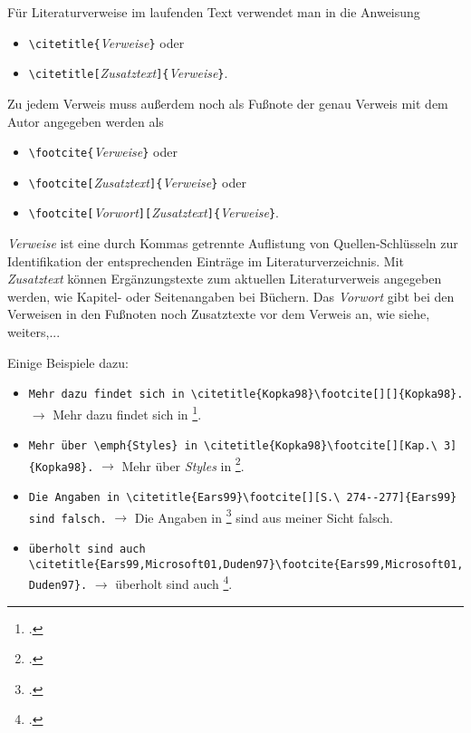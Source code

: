 Für Literaturverweise im laufenden Text verwendet man in \latex die Anweisung
\begin{itemize}
\item[] \verb!\citetitle{!\textit{Verweise}\verb!}! oder
\item[] \verb!\citetitle[!\textit{Zusatztext}\verb!]{!\textit{Verweise}\verb!}!.
\end{itemize}

\noindent%
Zu jedem Verweis muss außerdem noch als Fußnote der genau Verweis mit dem Autor angegeben werden als

\begin{itemize}
\item[] \verb!\footcite{!\textit{Verweise}\verb!}! oder
\item[] \verb!\footcite[!\textit{Zusatztext}\verb!]{!\textit{Verweise}\verb!}! oder
\item[] \verb!\footcite[!\textit{Vorwort}\verb!][!\textit{Zusatztext}\verb!]{!\textit{Verweise}\verb!}!.
\end{itemize}

\noindent%
\textit{Verweise} ist eine durch Kommas getrennte Auflistung von Quellen-Schlüsseln
zur Identifikation der entsprechenden Einträge im Literaturverzeichnis.
Mit \textit{Zusatztext} können Ergänzungstexte zum aktuellen Literaturverweis angegeben
werden, wie \zB Kapitel- oder Seitenangaben bei Büchern. Das \textit{Vorwort} gibt bei den Verweisen in den Fußnoten noch Zusatztexte vor dem Verweis an, wie \zB siehe, weiters,...

Einige Beispiele dazu:
\begin{itemize}
\item[] \verb!Mehr dazu findet sich in \citetitle{Kopka98}\footcite[][]{Kopka98}.! \newline
      $\rightarrow$ Mehr dazu findet sich in \footcite[][]{Kopka98}.
\item[] \verb!Mehr über \emph{Styles} in \citetitle{Kopka98}\footcite[][Kap.\ 3]{Kopka98}.! \newline
      $\rightarrow$ Mehr über \emph{Styles} in \footcite[][Kap.\ 3]{Kopka98}.
\item[] \verb!Die Angaben in \citetitle{Ears99}\footcite[][S.\ 274--277]{Ears99} sind falsch.! \newline
      $\rightarrow$ Die Angaben in \footcite[][S.\ 274--277]{Ears99} sind aus meiner Sicht falsch.
\item[] \verb!überholt sind auch \citetitle{Ears99,Microsoft01,Duden97}!\newline\verb!\footcite{Ears99,Microsoft01,Duden97}.! \newline
      $\rightarrow$ überholt sind auch \footcite{Ears99,Microsoft01,Duden97}.
\end{itemize}



